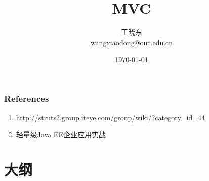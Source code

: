 
\title[KevinW@OUC]{\\  
  MVC}
\author[王晓东]{王晓东\\
  \href{mailto:wangxiaodong@ouc.edu.cn}{\footnotesize wangxiaodong@ouc.edu.cn}}
\date{\today}


 \frame{\titlepage}

\begin{frame}
\frametitle{References}
\begin{enumerate}
\item http://struts2.group.iteye.com/group/wiki/?category\_id=44
\item 轻量级Java EE企业应用实战
\end{enumerate}  
\end{frame}


\section*{大纲}

\section{}

